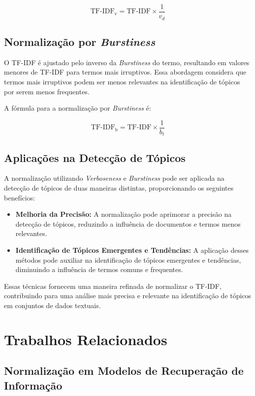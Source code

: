 \documentclass[12pt]{article}
\begin{document}
\[
\text{TF-IDF}_\text{v} = \text{TF-IDF} \times \frac{1}{v_d}
\]

\subsection{Normalização por \textit{Burstiness}}

O TF-IDF é ajustado pelo inverso da \textit{Burstiness} do termo, resultando em valores menores de TF-IDF para termos mais irruptivos. Essa abordagem considera que termos mais irruptivos podem ser menos relevantes na identificação de tópicos por serem menos frequentes.

A fórmula para a normalização por \textit{Burstiness} é:

\[
\text{TF-IDF}_\text{b} = \text{TF-IDF} \times \frac{1}{b_t}
\]

\subsection{Aplicações na Detecção de Tópicos}

A normalização utilizando \textit{Verboseness} e \textit{Burstiness} pode ser aplicada na detecção de tópicos de duas maneiras distintas, proporcionando os seguintes benefícios:

\begin{itemize}
  \item \textbf{Melhoria da Precisão:} A normalização pode aprimorar a precisão na detecção de tópicos, reduzindo a influência de documentos e termos menos relevantes.
  
  \item \textbf{Identificação de Tópicos Emergentes e Tendências:} A aplicação desses métodos pode auxiliar na identificação de tópicos emergentes e tendências, diminuindo a influência de termos comuns e frequentes.
\end{itemize}

Essas técnicas fornecem uma maneira refinada de normalizar o TF-IDF, contribuindo para uma análise mais precisa e relevante na identificação de tópicos em conjuntos de dados textuais.


\section{Trabalhos Relacionados}

\subsection{Normalização em Modelos de Recuperação de Informação}
\end{document}
